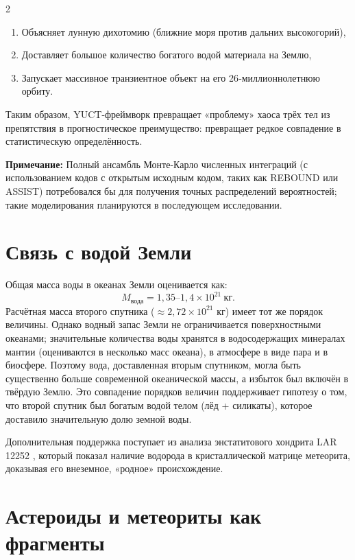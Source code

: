 \documentclass[11pt,a4paper]{article}
\begin{document}
\begin{multicols}{2}
		\begin{enumerate}
			\item Объясняет лунную дихотомию (ближние моря против дальних высокогорий),
			\item Доставляет большое количество богатого водой материала на Землю,
			\item Запускает массивное транзиентное объект на его 26‑миллионнолетнюю орбиту.
		\end{enumerate}
		
		Таким образом, YUCT-фреймворк превращает «проблему» хаоса трёх тел из препятствия в прогностическое преимущество: превращает редкое совпадение в статистическую определённость.
		
		\vspace{0.2cm}
		\noindent
		\textbf{Примечание:} Полный ансамбль Монте-Карло численных интеграций
		(с использованием кодов с открытым исходным кодом, таких как REBOUND или ASSIST) потребовался бы
		для получения точных распределений вероятностей; такие моделирования планируются в последующем исследовании.
		
		
		\section{Связь с водой Земли}
		
		Общая масса воды в океанах Земли оценивается как:
		\[
		M_{\text{вода}} = 1,35\text{–}1,4 \times 10^{21}\ \text{кг}.
		\]
		Расчётная масса второго спутника (\(\approx 2,72 \times 10^{21}\) кг) имеет тот же порядок величины. Однако водный запас Земли не ограничивается поверхностными океанами; значительные количества воды хранятся в водосодержащих минералах мантии (оцениваются в несколько масс океана), в атмосфере в виде пара и в биосфере. Поэтому вода, доставленная вторым спутником, могла быть существенно больше современной океанической массы, а избыток был включён в твёрдую Землю. Это совпадение порядков величин поддерживает гипотезу о том, что второй спутник был богатым водой телом (лёд + силикаты), которое доставило значительную долю земной воды.
		
		Дополнительная поддержка поступает из анализа энстатитового хондрита LAR 12252 \cite{Gardiner2025}, который показал наличие водорода в кристаллической матрице метеорита, доказывая его внеземное, «родное» происхождение.
		
		\section{Астероиды и метеориты как фрагменты}
		

\end{multicols}
\end{document}
